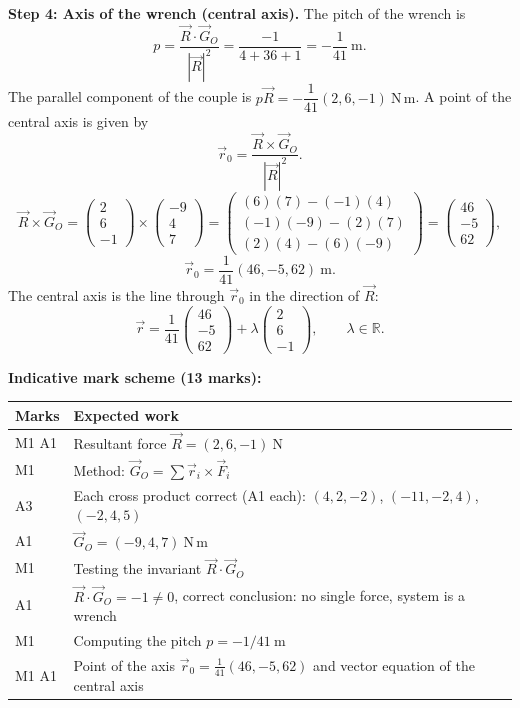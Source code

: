 \documentclass[11pt]{article}
\begin{document}
\begin{exoresolu}
\textbf{Step 4: Axis of the wrench (central axis).} The pitch of the wrench is
\[
p = \frac{\vec{R}\cdot\vec{G}_O}{|\vec{R}|^2} = \frac{-1}{4 + 36 + 1} = -\frac{1}{41}\ \mathrm{m}.
\]
The parallel component of the couple is $p\vec{R} = -\dfrac{1}{41}(2, 6, -1)\ \mathrm{N\,m}$. A point of the central axis is given by
\[
\vec{r}_0 = \frac{\vec{R} \times \vec{G}_O}{|\vec{R}|^2}.
\]
\[
\vec{R} \times \vec{G}_O =
\begin{pmatrix} 2 \\ 6 \\ -1 \end{pmatrix} \times
\begin{pmatrix} -9 \\ 4 \\ 7 \end{pmatrix} =
\begin{pmatrix} (6)(7)-(-1)(4) \\ (-1)(-9)-(2)(7) \\ (2)(4)-(6)(-9) \end{pmatrix} =
\begin{pmatrix} 46 \\ -5 \\ 62 \end{pmatrix},
\]
\[
\vec{r}_0 = \frac{1}{41}(46, -5, 62)\ \mathrm{m}.
\]
The central axis is the line through $\vec{r}_0$ in the direction of $\vec{R}$:
\[
\vec{r} = \frac{1}{41}\begin{pmatrix} 46 \\ -5 \\ 62 \end{pmatrix} + \lambda \begin{pmatrix} 2 \\ 6 \\ -1 \end{pmatrix}, \qquad \lambda \in \mathbb{R}.
\]

\textbf{Indicative mark scheme (13 marks):}
\begin{center}
\begin{tabularx}{\linewidth}{|l|X|}\hline
\rowcolor{popblueL} Marks & Expected work \\ \hline
M1 A1 & Resultant force $\vec{R} = (2, 6, -1)\ \mathrm{N}$ \\ \hline
M1 & Method: $\vec{G}_O = \sum \vec{r}_i \times \vec{F}_i$ \\ \hline
A3 & Each cross product correct (A1 each): $(4,2,-2)$, $(-11,-2,4)$, $(-2,4,5)$ \\ \hline
A1 & $\vec{G}_O = (-9, 4, 7)\ \mathrm{N\,m}$ \\ \hline
M1 & Testing the invariant $\vec{R}\cdot\vec{G}_O$ \\ \hline
A1 & $\vec{R}\cdot\vec{G}_O = -1 \neq 0$, correct conclusion: no single force, system is a wrench \\ \hline
M1 & Computing the pitch $p = -1/41\ \mathrm{m}$ \\ \hline
M1 A1 & Point of the axis $\vec{r}_0 = \frac{1}{41}(46, -5, 62)$ and vector equation of the central axis \\ \hline
\end{tabularx}
\end{center}


\end{exoresolu}
\end{document}

